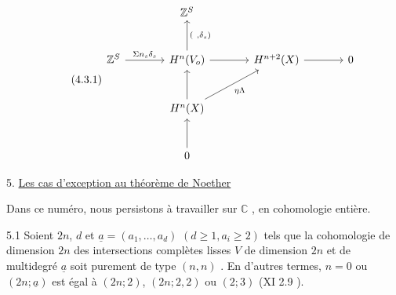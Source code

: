 \begin{equation}\tag{4.3.1}
\begin{tikzcd}[row sep=large, column sep=large]
{} & \mathbb{Z}^S & {} & {} \\
\mathbb{Z}^S \arrow[r, "{\Sigma n_s \delta_s}"] & H^n(V_o) \arrow[u, "{( \ , \delta_s)}"'] \arrow[r] & H^{n+2}(X) \arrow[r] & 0 \\
{} & H^n(X) \arrow[u] \arrow[ur, "{\eta\Lambda}"'] & {} & {} \\
{} & 0 \arrow[u] & {} &
{} \end{tikzcd}
\end{equation}



5. \underline{Les cas d'exception au théorème de Noether}

Dans ce numéro, nous persistons à travailler sur $\mathbb{C}$ , en cohomologie entière.

5.1 \quad Soient $2n$, $d$ et $\underline{a} = (a_1,\ldots,a_d)$ $(d \geq 1, a_i \geq 2)$ tels que la cohomologie de dimension $2n$ des intersections complètes lisses $V$ de dimension $2n$ et de multidegré $\underline{a}$ soit purement de type $(n, n)$ . En d'autres termes, $n = 0$ ou $(2n; \underline{a})$ est égal à $(2n; 2)$, $(2n; 2, 2)$ ou $(2; 3)$ (XI 2.9 ).

